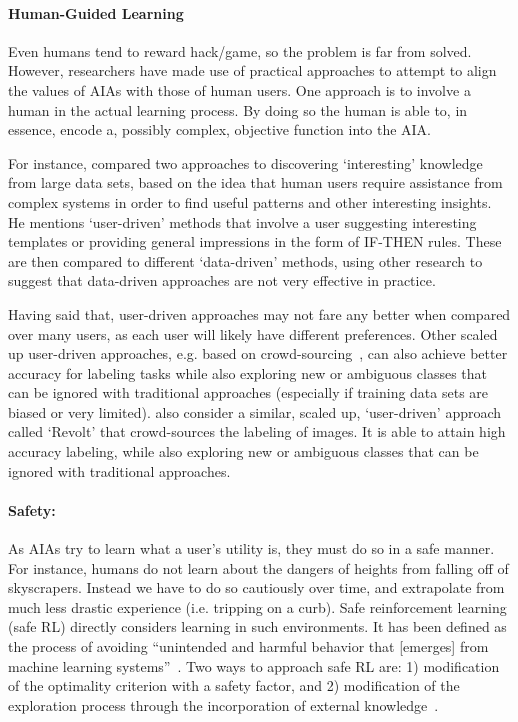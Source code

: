 
\paragraph{Human-Guided Learning}
Even humans tend to reward hack/game, so the problem is far from solved. However, researchers have made use of practical approaches to attempt to align the values of AIAs with those of human users. One approach is to involve a human in the actual learning process. By doing so the human is able to, in essence, encode a, possibly complex, objective function into the AIA.

For instance, \citet{Freitas2006-qo} compared two approaches to discovering `interesting' knowledge from large data sets, based on the idea that human users require assistance from complex systems in order to find useful patterns and other interesting insights. He mentions `user-driven' methods that involve a user suggesting interesting templates or providing general impressions in the form of IF-THEN rules. These are then compared to different `data-driven' methods, using other research to suggest that data-driven approaches are not very effective in practice.

Having said that, user-driven approaches may not fare any better when compared over many users, as each user will likely have different preferences. Other scaled up user-driven approaches, e.g. based on crowd-sourcing~\citet{Chang2017-kl}, can also achieve better accuracy for labeling tasks while also exploring new or ambiguous classes that can be ignored with traditional approaches (especially if training data sets are biased or very limited). \citet{Chang2017-kl} also consider a similar, scaled up, `user-driven' approach called `Revolt' that crowd-sources the labeling of images. It is able to attain high accuracy labeling, while also exploring new or ambiguous classes that can be ignored with traditional approaches.

\paragraph{Safety:}
As AIAs try to learn what a user's utility is, they must do so in a safe manner. For instance, humans do not learn about the dangers of heights from falling off of skyscrapers. Instead we have to do so cautiously over time, and extrapolate from much less drastic experience (i.e. tripping on a curb). Safe reinforcement learning (safe RL) directly considers learning in such environments. It has been defined as the process of avoiding ``unintended and harmful behavior that [emerges] from machine learning systems''~\cite{Amodei2016-xi}. Two ways to approach safe RL are: 1) modification of the optimality criterion with a safety factor, and 2) modification of the exploration process through the incorporation of external knowledge~\cite{Garcia2015-rs}.

